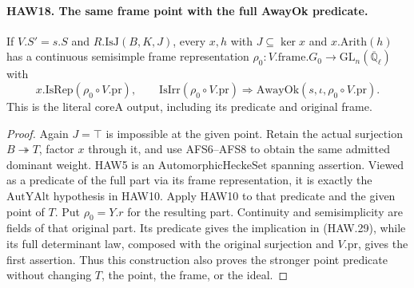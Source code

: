\documentclass[11pt,a4paper]{article}
\numberwithin{equation}{section}
\theoremstyle{remark}\newtheorem{remark}[theorem]{Remark}
\begin{document}
\paragraph{HAW18. The same frame point with the full AwayOk predicate.}
\label{claim:HAW18}
If $V.S'=s.S$ and $R.\mathrm{IsJ}(B,K,J)$, every
$x,h$ with $J\subseteq\ker x$ and $x.\mathrm{Arith}(h)$
has a continuous semisimple frame representation
$\rho_0:V.\mathrm{frame}.G_0\to\mathrm{GL}_n
(\overline{\mathbb Q}_\ell)$ with
\[
 x.\mathrm{IsRep}(\rho_0\circ V.\mathrm{pr}),\qquad
 \mathrm{IsIrr}(\rho_0\circ V.\mathrm{pr})
       \Longrightarrow\mathrm{AwayOk}(s,\iota,
                                     \rho_0\circ V.\mathrm{pr}).
 \tag{HAW.29}
\]
This is the literal $\mathrm{coreA}$ output, including its
predicate and original frame.
\begin{proof}
Again $J=\top$ is impossible at the given point.  Retain
the actual surjection $B\twoheadrightarrow T$, factor
$x$ through it, and use AFS6--AFS8 to obtain the same
admitted dominant weight.  HAW5 is an
$\mathrm{AutomorphicHeckeSet}$ spanning assertion.  Viewed
as a predicate of the full part via its frame representation,
it is exactly the $\mathrm{AutYAlt}$ hypothesis in HAW10.
Apply HAW10 to that predicate and the given point of $T$.
Put $\rho_0=Y.r$ for the resulting part.  Continuity and
semisimplicity are fields of that original part.  Its
predicate gives the implication in (HAW.29), while its full
determinant law, composed with the original surjection and
$V.\mathrm{pr}$, gives the first assertion.  Thus this
construction also proves the stronger point predicate
without changing $T$, the point, the frame, or the ideal.
\end{proof}

\end{document}
